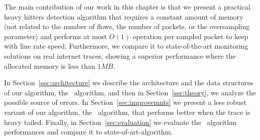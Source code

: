 The main contribution of our work in this chapter is that we present a practical heavy hitters detection algorithm that requires a constant amount of memory (not related to the number of flows, the number of packets, or the oversampling parameter) and performs at most $O(1)$ operation per sampled packet to keep with line rate speed. Furthermore, we compare it to state-of-the-art monitoring solutions on real internet traces, showing a superior performance where the allocated memory is less than $1MB$.

In Section~\ref{sec:architecture} we describe the architecture and the data structures of our algorithm, the \cs\ algorithm, and then in Section~\ref{sec:theory}, we analyze the possible source of errors. In Section~\ref{sec:improvemnts} we present a less robust variant of our algorithm, the \eb\ algorithm, that performs better when the trace is heavy tailed. Finally, in Section~\ref{sec:evaluation} we evaluate the \cs\ algorithm performances and compare it to state-of-art-algorithm.
